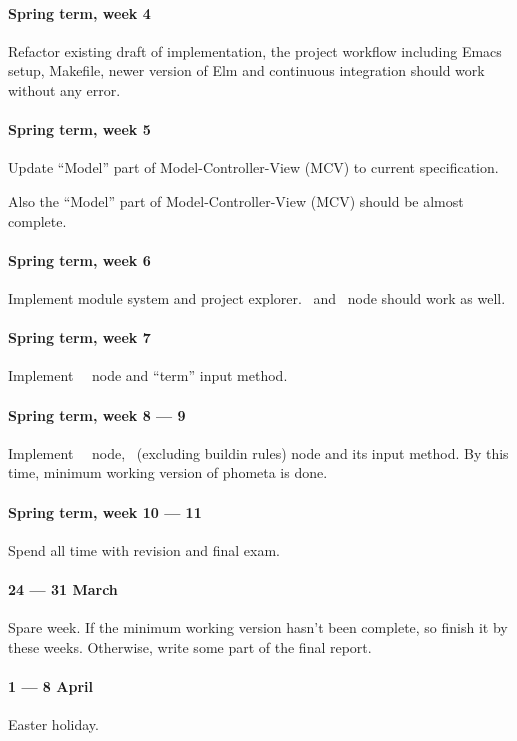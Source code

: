 \paragraph{Spring term, week 4} Refactor existing draft of implementation, the project workflow including Emacs setup, Makefile, newer version of Elm and continuous integration should work without any error.

\paragraph{Spring term, week 5} Update ``Model'' part of Model-Controller-View (MCV) to current specification.

Also the ``Model'' part of Model-Controller-View (MCV) should be almost complete.

\paragraph{Spring term, week 6} Implement module system and project explorer. \kOpen\ and \kComment\ node should work as well.

\paragraph{Spring term, week 7} Implement \kInductive\ \kGrammar\ node and ``term'' input method.

\paragraph{Spring term, week 8 --- 9} Implement \kInference\ \kRule\ node, \kTheorem\ (excluding buildin rules) node and its input method. By this time, minimum working version of phometa is done.

\paragraph{Spring term, week 10 --- 11} Spend all time with revision and final exam.

\paragraph{24 --- 31 March} Spare week. If the minimum working version hasn't been complete, so finish it by these weeks. Otherwise, write some part of the final report.

\paragraph{1 --- 8 April} Easter holiday.

